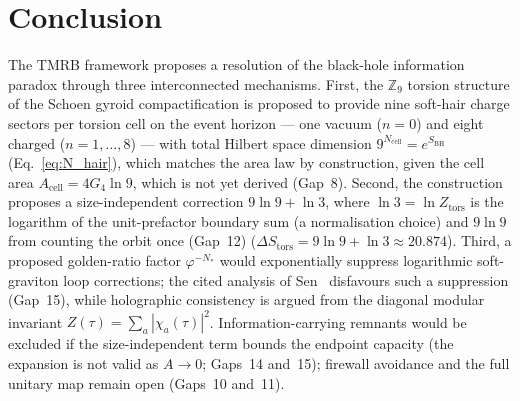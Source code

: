 \documentclass[11pt,a4paper]{article}
\begin{document}
\section{Conclusion}
\label{sec:conclusion}

The TMRB framework proposes a resolution of the black-hole information paradox
through three interconnected mechanisms.  First, the $\mathbb{Z}_9$ torsion structure of the
Schoen gyroid compactification is proposed to provide nine soft-hair charge sectors per torsion
cell on the event horizon — one vacuum ($n=0$) and eight charged ($n=1,\ldots,8$)
— with total Hilbert space dimension $9^{N_{\mathrm{cell}}} = e^{S_{\mathrm{BH}}}$
(Eq.~\eqref{eq:N_hair}), which matches the area law by construction, given the cell area
$A_{\mathrm{cell}} = 4G_4\ln 9$, which is not yet derived (Gap~8).  Second,
the construction proposes a size-independent correction $9\ln 9 + \ln 3$, where
$\ln 3 = \ln Z_{\mathrm{tors}}$ is the logarithm of the unit-prefactor boundary sum (a normalisation choice) and $9\ln 9$ from counting the orbit once (Gap~12)
($\Delta S_{\mathrm{tors}} = 9\ln 9 + \ln 3 \approx 20.874$).
Third, a proposed golden-ratio factor $\varphi^{-N_*}$ would
exponentially suppress logarithmic soft-graviton loop corrections; the cited analysis of Sen~\cite{Sen2012} disfavours such a suppression (Gap~15), while
holographic consistency is argued from the diagonal modular invariant
$Z(\tau)=\sum_a|\chi_a(\tau)|^2$.  Information-carrying remnants would be excluded if the size-independent term bounds the endpoint capacity (the expansion is not valid as $A\to 0$; Gaps~14 and~15); firewall
avoidance and the full unitary map remain open (Gaps~10 and~11).
\end{document}
